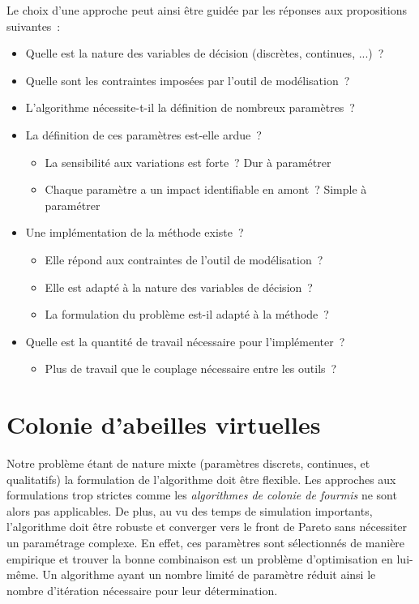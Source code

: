 {
\noindent
Le choix d’une approche peut ainsi être guidée par les réponses aux propositions
suivantes~:
\begin{itemize}
  \item Quelle est la nature des variables de décision (discrètes, continues, ...)~?
  \item Quelle sont les contraintes imposées par l’outil de modélisation~?
  \item L’algorithme nécessite-t-il la définition de nombreux paramètres~?
  \item La définition de ces paramètres est-elle ardue~?
    \begin{itemize}
      \item La sensibilité aux variations est forte~? Dur à paramétrer
      \item Chaque paramètre a un impact identifiable en amont~? Simple à paramétrer
    \end{itemize}
  \item Une implémentation de la méthode existe~?
    \begin{itemize}
      \item Elle répond aux contraintes de l’outil de modélisation~?
      \item Elle est adapté à la nature des variables de décision~?
      \item La formulation du problème est-il adapté à la méthode~?
    \end{itemize}
  \item Quelle est la quantité de travail nécessaire pour l’implémenter~?
    \begin{itemize}
      \item Plus de travail que le couplage nécessaire entre les outils~?
    \end{itemize}
\end{itemize}
}




\section{Colonie d’abeilles virtuelles} %
\label{sec:artificial_bee_colony}
Notre problème étant de nature mixte (paramètres discrets, continues, et
qualitatifs) la formulation de l’algorithme doit être flexible. Les approches
aux formulations trop strictes comme les \textit{algorithmes de colonie de
fourmis} ne sont alors pas applicables. De plus, au vu des temps de simulation
importants, l’algorithme doit être robuste et converger vers le front de Pareto
sans nécessiter un paramétrage complexe. En effet, ces paramètres sont
sélectionnés de manière empirique et trouver la bonne combinaison est un
problème d’optimisation en lui-même. Un algorithme ayant un nombre limité de
paramètre réduit ainsi le nombre d’itération nécessaire pour leur détermination.

